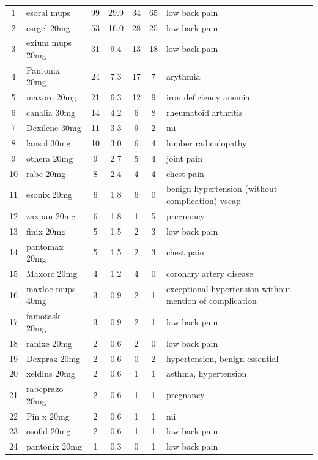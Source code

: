 \documentclass[10pt]{article}
\begin{document}
\begin{longtable}{c|l|c|c|c|c|p{5cm}}
1 & esoral mups & 99 & 29.9 & 34 & 65 & low back pain \\
\rowcolor{altrowcolor}
2 & esrgel 20mg & 53 & 16.0 & 28 & 25 & low back pain \\
3 & exium mups 20mg & 31 & 9.4 & 13 & 18 & low back pain \\
\rowcolor{altrowcolor}
4 & Pantonix 20mg & 24 & 7.3 & 17 & 7 & arythmia \\
5 & maxorc 20mg & 21 & 6.3 & 12 & 9 & iron deficiency anemia \\
\rowcolor{altrowcolor}
6 & canalia 30mg & 14 & 4.2 & 6 & 8 & rheumatoid arthritis \\
7 & Dexilene 30mg & 11 & 3.3 & 9 & 2 & mi \\
\rowcolor{altrowcolor}
8 & lansol 30mg & 10 & 3.0 & 6 & 4 & lumber radiculopathy \\
9 & othera 20mg & 9 & 2.7 & 5 & 4 & joint pain \\
\rowcolor{altrowcolor}
10 & rabe 20mg & 8 & 2.4 & 4 & 4 & chest pain \\
11 & esonix 20mg & 6 & 1.8 & 6 & 0 & benign hypertension (without complication) vscap \\
\rowcolor{altrowcolor}
12 & zaxpan 20mg & 6 & 1.8 & 1 & 5 & pregnancy \\
13 & finix 20mg & 5 & 1.5 & 2 & 3 & low back pain \\
\rowcolor{altrowcolor}
14 & pantomax 20mg & 5 & 1.5 & 2 & 3 & chest pain \\
15 & Maxorc 20mg & 4 & 1.2 & 4 & 0 & coronary artery disease \\
\rowcolor{altrowcolor}
16 & maxloe mups 40mg & 3 & 0.9 & 2 & 1 & exceptional hypertension without mention of complication \\
17 & famotask 20mg & 3 & 0.9 & 2 & 1 & low back pain \\
\rowcolor{altrowcolor}
18 & ranixe 20mg & 2 & 0.6 & 2 & 0 & low back pain \\
19 & Dexpraz 20mg & 2 & 0.6 & 0 & 2 & hypertension, benign essential \\
\rowcolor{altrowcolor}
20 & xeldins 20mg & 2 & 0.6 & 1 & 1 & asthma, hypertension \\
21 & rabeprazo 20mg & 2 & 0.6 & 1 & 1 & pregnancy \\
\rowcolor{altrowcolor}
22 & Pin x 20mg & 2 & 0.6 & 1 & 1 & mi \\
23 & osofid 20mg & 2 & 0.6 & 1 & 1 & low back pain \\
\rowcolor{altrowcolor}
24 & pantonix 20mg & 1 & 0.3 & 0 & 1 & low back pain \\

\end{longtable}
\end{document}
